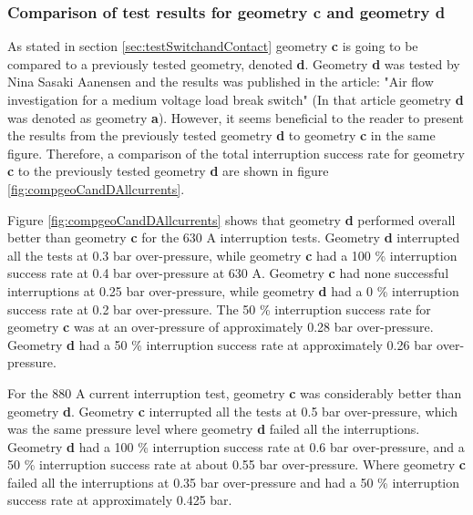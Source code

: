 \documentclass[10pt,b5paper,twoside]{article}
\begin{document}
\subsubsection{Comparison of test results for geometry \textbf{c} and geometry \textbf{d}}

As stated in section \ref{sec:testSwitchandContact} geometry \textbf{c} is going to be compared to a previously tested geometry, denoted \textbf{d}. Geometry \textbf{d} was tested by Nina Sasaki Aanensen and the results was published in the article: "Air flow investigation for a medium voltage load break switch" \cite{bib:AFIMVLBA} (In that article geometry \textbf{d} was denoted as geometry \textbf{a}). However, it seems beneficial to the reader to present the results from the previously tested geometry \textbf{d} to geometry \textbf{c} in the same figure. Therefore, a comparison of the total interruption success rate for geometry \textbf{c} to the previously tested geometry \textbf{d} are shown in figure \ref{fig:compgeoCandDAllcurrents}.

Figure \ref{fig:compgeoCandDAllcurrents} shows that geometry \textbf{d} performed overall better than geometry \textbf{c} for the 630 A interruption tests. Geometry \textbf{d} interrupted all the tests at 0.3 bar over-pressure, while geometry \textbf{c} had a 100 \% interruption success rate at 0.4 bar over-pressure at 630 A. Geometry \textbf{c} had none successful interruptions at 0.25 bar over-pressure, while geometry \textbf{d} had a 0 \% interruption success rate at 0.2 bar over-pressure. The 50 \% interruption success rate for geometry \textbf{c} was at an over-pressure of approximately 0.28 bar over-pressure. Geometry \textbf{d} had a 50 \% interruption success rate at approximately 0.26 bar over-pressure.

For the 880 A current interruption test, geometry \textbf{c} was considerably better than geometry \textbf{d}. Geometry \textbf{c} interrupted all the tests at 0.5 bar over-pressure, which was the same pressure level where geometry \textbf{d} failed all the interruptions. Geometry \textbf{d} had a 100 \% interruption success rate at 0.6 bar over-pressure, and a 50 \% interruption success rate at about 0.55 bar over-pressure. Where geometry \textbf{c} failed all the interruptions at 0.35 bar over-pressure and had a 50 \% interruption success rate at approximately 0.425 bar.
\end{document}
